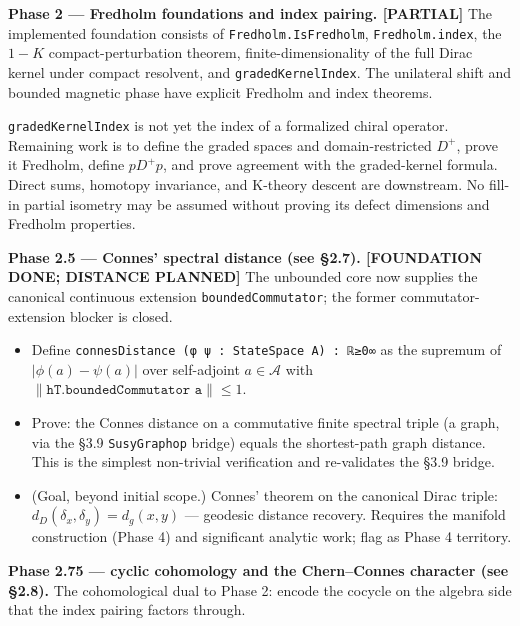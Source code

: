 \documentclass[
  11pt,
]{article}
\providecommand{\tightlist}{%
  \setlength{\itemsep}{0pt}\setlength{\parskip}{0pt}}
\begin{document}
\textbf{Phase 2 --- Fredholm foundations and index pairing. [PARTIAL]}
The implemented foundation consists of \texttt{Fredholm.IsFredholm},
\texttt{Fredholm.index}, the \(1-K\) compact-perturbation theorem,
finite-dimensionality of the full Dirac kernel under compact resolvent,
and \texttt{gradedKernelIndex}. The unilateral shift and bounded
magnetic phase have explicit Fredholm and index theorems.

\texttt{gradedKernelIndex} is not yet the index of a formalized chiral
operator. Remaining work is to define the graded spaces and
domain-restricted \(D^+\), prove it Fredholm, define \(pD^+p\), and prove
agreement with the graded-kernel formula. Direct sums, homotopy
invariance, and K-theory descent are downstream. No fill-in partial
isometry may be assumed without proving its defect dimensions and
Fredholm properties.

\textbf{Phase 2.5 --- Connes' spectral distance (see §2.7).
[FOUNDATION DONE; DISTANCE PLANNED]} The unbounded core now supplies the
canonical continuous extension \texttt{boundedCommutator}; the former
commutator-extension blocker is closed.

\begin{itemize}
\tightlist
\item
  Define \texttt{connesDistance\ (φ\ ψ\ :\ StateSpace\ A)\ :\ ℝ≥0∞} as
  the supremum of \(|\phi(a) - \psi(a)|\) over self-adjoint
  \(a \in \mathcal{A}\) with
  \(\|\texttt{hT.boundedCommutator a}\| \leq 1\).
\item
  Prove: the Connes distance on a commutative finite spectral triple (a
  graph, via the §3.9 \texttt{SusyGraphop} bridge) equals the
  shortest-path graph distance. This is the simplest non-trivial
  verification and re-validates the §3.9 bridge.
\item
  (Goal, beyond initial scope.) Connes' theorem on the canonical Dirac
  triple: \(d_D(\delta_x, \delta_y) = d_g(x, y)\) --- geodesic distance
  recovery. Requires the manifold construction (Phase 4) and significant
  analytic work; flag as Phase 4 territory.
\end{itemize}

\textbf{Phase 2.75 --- cyclic cohomology and the Chern--Connes character
(see §2.8).} The cohomological dual to Phase 2: encode the cocycle on
the algebra side that the index pairing factors through.
\end{document}
